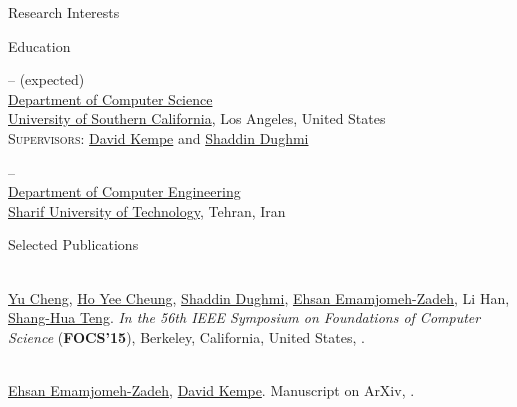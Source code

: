 \documentclass{resume}
\begin{document}
\maketitle



\begin{category}{Research Interests}




\end{category}


\begin{category}{Education}


\hfill{ --  (expected)}\\
\href{http://www.cs.usc.edu/}{Department of Computer Science}\\
\href{http://www.usc.edu/}{University of Southern California},
Los Angeles, United States\\
\textsc{Supervisors}:
\href{http://www-bcf.usc.edu/~dkempe/}{David Kempe} and
\href{http://www-bcf.usc.edu/~shaddin/}{Shaddin Dughmi}

\hfill{ -- }\\
\href{http://ce.sharif.edu}{Department of Computer Engineering}\\
\href{http://www.sharif.ir/web/en}{Sharif University of Technology},
Tehran, Iran

\end{category}


\begin{category}{Selected Publications}


\\
\href{http://www-scf.usc.edu/~chen533/}{Yu Cheng},
\href{http://www-scf.usc.edu/~hoyeeche/}{Ho Yee Cheung},
\href{http://www-bcf.usc.edu/~shaddin/}{Shaddin Dughmi},
\href{http://www-scf.usc.edu/~emamjome/}{Ehsan Emamjomeh-Zadeh},
Li Han,
\href{http://www-bcf.usc.edu/~shanghua/}{Shang-Hua Teng}.
\textit{In the 56th IEEE Symposium on Foundations of Computer Science}
(\textbf{FOCS'15}),
Berkeley, California, United States,
.

\\
\href{http://www-scf.usc.edu/~emamjome/}{Ehsan Emamjomeh-Zadeh},
\href{http://www-bcf.usc.edu/~dkempe/}{David Kempe}.
Manuscript on ArXiv,
.

\end{category}
\end{document}
